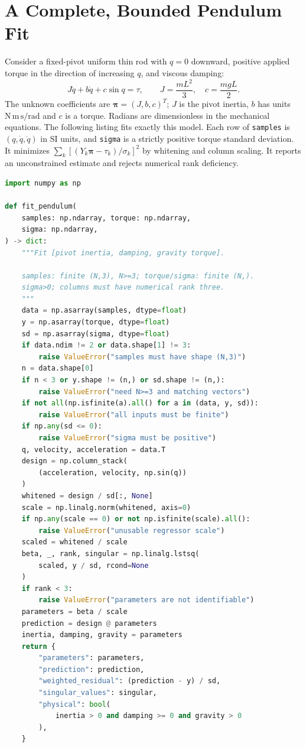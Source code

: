 \section{A Complete, Bounded Pendulum Fit}

Consider a fixed-pivot uniform thin rod with $q=0$ downward, positive applied
torque in the direction of increasing $q$, and viscous damping:
\begin{equation}
  J\ddot q+b\dot q+c\sin q=\tau,\qquad
  J=\frac{mL^2}{3},\quad c=\frac{mgL}{2}.
  \label{eq:identified-rod}
\end{equation}
The unknown coefficients are $\bm{\pi}=(J,b,c)^T$; $J$ is the
pivot inertia, $b$ has units $\mathrm{N\,m\,s/rad}$ and $c$ is a torque.
Radians are dimensionless in the mechanical equations. The following listing
fits exactly this model. Each row of \texttt{samples} is
$(q,\dot q,\ddot q)$ in SI units, and \texttt{sigma} is a strictly positive
torque standard deviation. It minimizes
$\sum_k[(Y_k\bm{\pi}-\tau_k)/\sigma_k]^2$ by whitening and column scaling.
It reports an unconstrained estimate and rejects numerical rank deficiency.

\begin{lstlisting}[language=Python, caption={Weighted Identification of a Damped Uniform Rod}]
import numpy as np

def fit_pendulum(
    samples: np.ndarray, torque: np.ndarray,
    sigma: np.ndarray,
) -> dict:
    """Fit [pivot inertia, damping, gravity torque].

    samples: finite (N,3), N>=3; torque/sigma: finite (N,).
    sigma>0; columns must have numerical rank three.
    """
    data = np.asarray(samples, dtype=float)
    y = np.asarray(torque, dtype=float)
    sd = np.asarray(sigma, dtype=float)
    if data.ndim != 2 or data.shape[1] != 3:
        raise ValueError("samples must have shape (N,3)")
    n = data.shape[0]
    if n < 3 or y.shape != (n,) or sd.shape != (n,):
        raise ValueError("need N>=3 and matching vectors")
    if not all(np.isfinite(a).all() for a in (data, y, sd)):
        raise ValueError("all inputs must be finite")
    if np.any(sd <= 0):
        raise ValueError("sigma must be positive")
    q, velocity, acceleration = data.T
    design = np.column_stack(
        (acceleration, velocity, np.sin(q))
    )
    whitened = design / sd[:, None]
    scale = np.linalg.norm(whitened, axis=0)
    if np.any(scale == 0) or not np.isfinite(scale).all():
        raise ValueError("unusable regressor scale")
    scaled = whitened / scale
    beta, _, rank, singular = np.linalg.lstsq(
        scaled, y / sd, rcond=None
    )
    if rank < 3:
        raise ValueError("parameters are not identifiable")
    parameters = beta / scale
    prediction = design @ parameters
    inertia, damping, gravity = parameters
    return {
        "parameters": parameters,
        "prediction": prediction,
        "weighted_residual": (prediction - y) / sd,
        "singular_values": singular,
        "physical": bool(
            inertia > 0 and damping >= 0 and gravity > 0
        ),
    }
\end{lstlisting}

